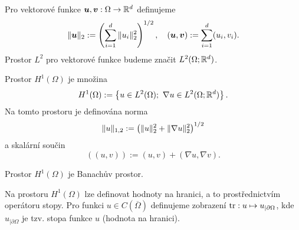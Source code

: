 Pro vektorové funkce $\mathbf{\boldsymbol{u}},\mathbf{\boldsymbol{v}}:\Omega\rightarrow\mathbb R^d$ definujeme
\[ \|\mathbf{\boldsymbol{u}}\|_2 := \left(\sum_{i=1}^d\|u_i\|_2^2\right)^{1/2},\quad (\mathbf{\boldsymbol{u}},\mathbf{\boldsymbol{v}}):=\sum_{i=1}^d(u_i,v_i). \]
Prostor $L^2$ pro vektorové funkce budeme značit $L^2(\Omega;\mathbb R^d)$.
\begin{df}
Prostor $H^1(\Omega)$ je množina
\[ H^1(\Omega):=\left\{u\in L^2(\Omega);~\nabla u\in L^2(\Omega;\mathbb R^d)\right\}. \]
Na tomto prostoru je definována norma
\[ \|u\|_{1,2} := \left(\|u\|_2^2 + \|\nabla u\|_2^2\right)^{1/2} \]
a skalární součin
\[ ((u,v)):=(u,v) + (\nabla u,\nabla v). \]
\end{df}
\begin{veta}
Prostor $H^1(\Omega)$ je Banachův prostor.
\end{veta}






Na prostoru $H^1(\Omega)$ lze definovat hodnoty na hranici, a to prostřednictvím operátoru stopy.
Pro funkci $u\in C(\overline\Omega)$ definujeme zobrazení $\operatorname{tr}:u\mapsto u_{|\partial\Omega}$, kde $u_{|\partial\Omega}$ je tzv. stopa funkce $u$ (hodnota na hranici).



